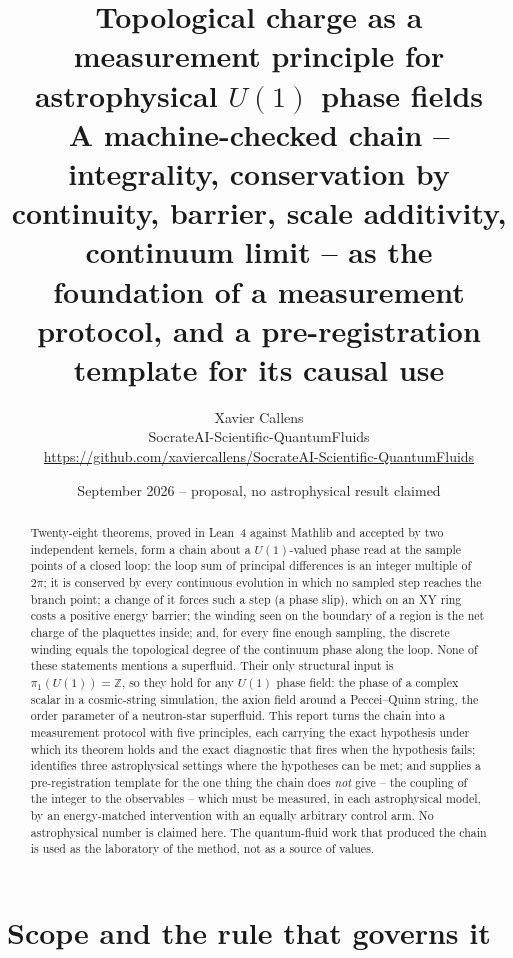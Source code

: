 \documentclass[11pt,a4paper]{article}
\title{\textbf{Topological charge as a measurement principle for astrophysical $U(1)$ phase fields}\\
\large A machine-checked chain -- integrality, conservation by continuity, barrier, scale additivity,
continuum limit -- as the foundation of a measurement protocol, and a pre-registration template for
its causal use}
\author{Xavier Callens\\
\small SocrateAI-Scientific-QuantumFluids\\
\small \url{https://github.com/xaviercallens/SocrateAI-Scientific-QuantumFluids}}
\date{September 2026 -- proposal, no astrophysical result claimed}
\begin{document}
\maketitle

\begin{abstract}
\noindent
Twenty-eight theorems, proved in Lean~4 against Mathlib and accepted by two independent kernels, form
a chain about a $U(1)$-valued phase read at the sample points of a closed loop: the loop sum of
principal differences is an integer multiple of $2\pi$; it is conserved by every continuous evolution
in which no sampled step reaches the branch point; a change of it forces such a step (a phase slip),
which on an XY ring costs a positive energy barrier; the winding seen on the boundary of a region is
the net charge of the plaquettes inside; and, for every fine enough sampling, the discrete winding
equals the topological degree of the continuum phase along the loop. None of these statements
mentions a superfluid. Their only structural input is $\pi_1(U(1))=\mathbb Z$, so they hold for any
$U(1)$ phase field: the phase of a complex scalar in a cosmic-string simulation, the axion field
around a Peccei--Quinn string, the order parameter of a neutron-star superfluid. This report turns
the chain into a measurement protocol with five principles, each carrying the exact hypothesis under
which its theorem holds and the exact diagnostic that fires when the hypothesis fails; identifies
three astrophysical settings where the hypotheses can be met; and supplies a pre-registration
template for the one thing the chain does \emph{not} give -- the coupling of the integer to the
observables -- which must be measured, in each astrophysical model, by an energy-matched
intervention with an equally arbitrary control arm. No astrophysical number is claimed here. The
quantum-fluid work that produced the chain is used as the laboratory of the method, not as a source
of values.
\end{abstract}

\section{Scope and the rule that governs it}
\end{document}

